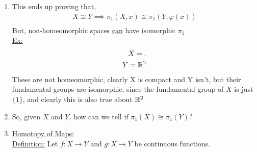 \begin{enumerate}
\begin{proof}
\begin{align*}
                        =(\varphi\circ\varphi^{-1}),\ \text{by lemma 1 shown today}\\
                        =id_{*},\ \text{by definition of $\varphi^{-1}$ (identity on y)}\\
                        =id,\ \text{by lemma 2 shown today (identity on x)}\\
                        (\varphi^{-1})_{*}\circ\varphi_{*}=(\varphi^{-1}\circ\varphi)_{*}=id_{*}=id\\
                    \end{align*}
                    This by definition means $\varphi_{*}$ and $(\varphi^{-1})_{*}$ are inverse functions.
                    Additionally, this small red box has made it onto the board, for clarification.
                    \begin{align*}
                        id_x: X \rightarrow Y\\
                        id_{\pi_1(X,x)}:\pi_1(X,x)\rightarrow\pi_1(X,x)\\
                        \text{Lemma: }(id_{x})_{*}id_{\pi_1(X,x)}\\
                    \end{align*}
                \end{proof}
        \item
            This ends up proving that,
            \begin{align*}
                X\cong Y\implies\pi_1(X,x)\cong\pi_1(Y,\varphi(x))\\
            \end{align*}
            But, non-homeomorphic spaces \underline{can} have isomorphic $\pi_{1}$\\
            \underline{Ex:}
            \begin{align*}
                X=.\\
                Y=\mathbb{R}^2\\
            \end{align*}
            These are not homeomorphic, clearly X is compact and Y isn't, but their fundamental groups are
            isomorphic, since the fundamental group of $X$ is just $\{1\}$, and clearly this is also true
            about $\mathbb{R}^2$
        \item So, given $X$ and $Y$, how can we tell if $\pi_1(X)\cong\pi_1(Y)$?
        \item \underline{\underline{Homotopy of Maps:}}\\
            \underline{Definition:} Let $f: X\rightarrow Y$ and $g: X\rightarrow Y$ be continuous functions.

\end{enumerate}
